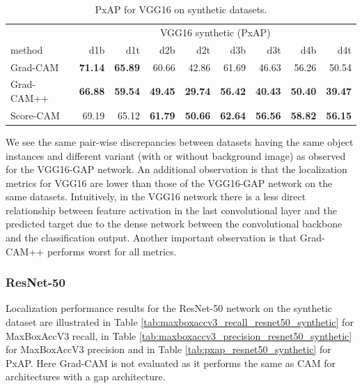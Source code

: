\begin{table}[ht]
\centering
\begin{tabular}{lrrrrrrrr}
\toprule
 & \multicolumn{8}{c}{VGG16 synthetic (PxAP)} \\
method & d1b & d1t & d2b & d2t & d3b & d3t & d4b & d4t \\
\cmidrule(lr){1-1} \cmidrule(lr){2-9}
Grad-CAM & \color{teal} \bfseries 71.14 & \color{teal} \bfseries 65.89 & 60.66 & 42.86 & 61.69 & 46.63 & 56.26 & 50.54 \\
Grad-CAM++ & \color{purple} \bfseries 66.88 & \color{purple} \bfseries 59.54 & \color{purple} \bfseries 49.45 & \color{purple} \bfseries 29.74 & \color{purple} \bfseries 56.42 & \color{purple} \bfseries 40.43 & \color{purple} \bfseries 50.40 & \color{purple} \bfseries 39.47 \\
Score-CAM & 69.19 & 65.12 & \color{teal} \bfseries 61.79 & \color{teal} \bfseries 50.66 & \color{teal} \bfseries 62.64 & \color{teal} \bfseries 56.56 & \color{teal} \bfseries 58.82 & \color{teal} \bfseries 56.15 \\
\bottomrule
\end{tabular}
\caption[PxAP for VGG16 on synthetic datasets]{PxAP for VGG16 on synthetic datasets.}
\label{tab:pxap_vgg16_base_synthetic}
\end{table}

We see the same pair-wise discrepancies between datasets having the same object instances and different variant (with or without background image) as observed for the VGG16-GAP network. An additional observation is that the localization metrics for VGG16 are lower than those of the VGG16-GAP network on the same datasets. Intuitively, in the VGG16 network there is a less direct relationship between feature activation in the last convolutional layer and the predicted target due to the dense network between the convolutional backbone and the classification output. Another important observation is that Grad-CAM++ performs worst for all metrics.

\subsubsection{ResNet-50}
Localization performance results for the ResNet-50 network on the synthetic dataset are illustrated in Table \ref{tab:maxboxaccv3_recall_resnet50_synthetic} for MaxBoxAccV3 recall, in Table \ref{tab:maxboxaccv3_precision_resnet50_synthetic} for MaxBoxAccV3 precision and in Table \ref{tab:pxap_resnet50_synthetic} for PxAP. Here Grad-CAM is not evaluated as it performs the same as CAM for architectures with a \acrshort{gap} architecture.

